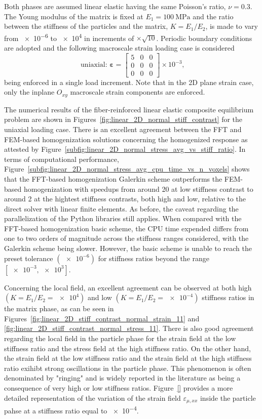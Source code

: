 Both phases are assumed linear elastic having the same Poisson's ratio, \(\nu=0.3\).
The Young modulus of the matrix is fixed at \(E_1=\SI{100}{\mega\pascal}\) and the ratio between the stiffness of the particles and the matrix, \(K=E_1/E_2\), is made to vary from \num{e-6} to \num{e4} in increments of \(\times \sqrt{10}\).
Periodic boundary conditions are adopted and the following macroscale strain loading case is considered
\begin{equation}
\text { uniaxial: } \bm{\varepsilon}=\left[\begin{array}{lll}
5 & 0 & 0 \\
0 & 0 & 0 \\
0 & 0 & 0
\end{array}\right] \times 10^{-3},
\end{equation}
being enforced in a single load increment.
Note that in the 2D plane strain case, only the inplane \(O_{x y}\) macroscale strain components are enforced.

The numerical results of the fiber-reinforced linear elastic composite equilibrium problem are shown in Figures~\ref{fig:linear_2D_normal_stiff_contrast} for the uniaxial loading case.
There is an excellent agreement between the FFT and FEM-based homogenization solutions concerning the homogenized response as attested by Figure~\ref{subfig:linear_2D_normal_stress_avg_vs_stiff_ratio}.
In terms of computational performance, Figure~\ref{subfig:linear_2D_normal_stress_avg_cpu_time_vs_n_voxels} shows that the FFT-based homogenization Galerkin scheme outperforms the FEM-based homogenization with speedups from around 20 at low stiffness contrast to around 2 at the hightest stiffness contrasts, both high and low, relative to the direct solver with linear finite elements.
As before, the caveat regarding the parallelization of the Python libraries still applies.
When compared with the FFT-based homogenization basic scheme, the CPU time expended differs from one to two orders of magnitude across the stiffness ranges considered, with the Galerkin scheme being slower.
However, the basic scheme is unable to reach the preset tolerance \((\num{e-6})\) for stiffness ratios beyond the range \([\num{e-3},\num{e3}]\).

Concerning the local field, an excellent agreement can be observed at both high \((K=E_1/E_2=\num{e4})\) and low \((K=E_1/E_2=\num{e-4})\) stiffness ratios in the matrix phase, as can be seen in Figures~\ref{fig:linear_2D_stiff_contrast_normal_strain_11} and \ref{fig:linear_2D_stiff_contrast_normal_stress_11}.
There is also good agreement regarding the local field in the particle phase for the strain field at the low stiffness ratio and the stress field at the high stiffness ratio.
On the other hand, the strain field at the low stiffness ratio and the strain field at the high stiffness ratio exihibt strong oscillations in the particle phase.
This phenomenon is often denominated by "ringing" and is widely reported in the literature as being a consequence of very high or low stiffness ratios.
Figure~\ref{} provides a more detailed representation of the variation of the strain field \(\varepsilon_{\mu,xx}\) inside the particle pahse at a stiffness ratio equal to \num{e-4}.


